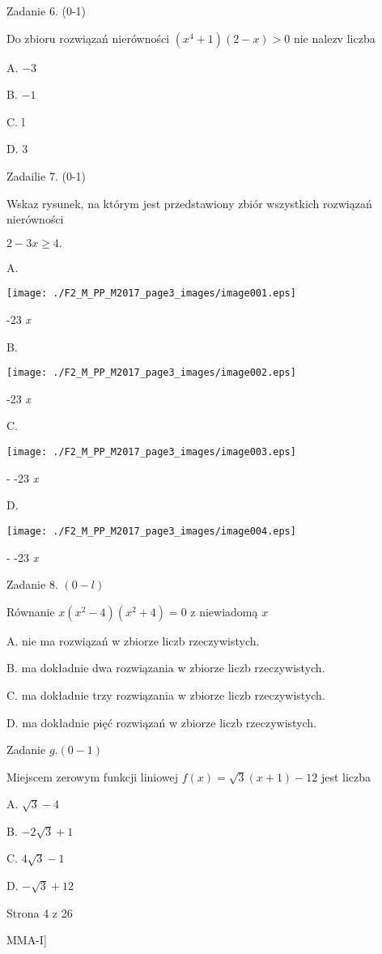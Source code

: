 \documentclass[a4paper,12pt]{article}
\begin{document}
Zadanie 6. (0-1)

Do zbioru rozwiązań nierówności $(x^{4}+1)(2-x)>0$ nie nalez$\mathrm{v}$ liczba

A. $-3$

B. $-1$

C. l

D. 3

Zadailie 7. (0-1)

Wskaz rysunek, na którym jest przedstawiony zbiór wszystkich rozwiązań nierówności

$2-3x\geq 4.$

A.
\begin{center}
\texttt{[image: ./F2\_M\_PP\_M2017\_page3\_images/image001.eps]}
\end{center}
-23  {\it x}

B.
\begin{center}
\texttt{[image: ./F2\_M\_PP\_M2017\_page3\_images/image002.eps]}
\end{center}
-23  {\it x}

C.
\begin{center}
\texttt{[image: ./F2\_M\_PP\_M2017\_page3\_images/image003.eps]}
\end{center}
- -23  {\it x}

D.
\begin{center}
\texttt{[image: ./F2\_M\_PP\_M2017\_page3\_images/image004.eps]}
\end{center}
- -23  {\it x}

Zadanie 8. $(0-l)$

Równanie $x(x^{2}-4)(x^{2}+4)=0$ z niewiadomą $x$

A. nie ma rozwiązań w zbiorze liczb rzeczywistych.

B. ma dokładnie dwa rozwiązania w zbiorze liczb rzeczywistych.

C. ma dokładnie trzy rozwiązania w zbiorze liczb rzeczywistych.

D. ma dokładnie pięć rozwiązań w zbiorze liczb rzeczywistych.

Zadanie $g. (0-1)$

Miejscem zerowym funkcji liniowej $f(x)=\sqrt{3}(x+1)-12$ jest liczba

A. $\sqrt{3}-4$

B. $-2\sqrt{3}+1$

C. $4\sqrt{3}-1$

D. $-\sqrt{3}+12$

Strona 4 z 26

MMA-I]
\end{document}
